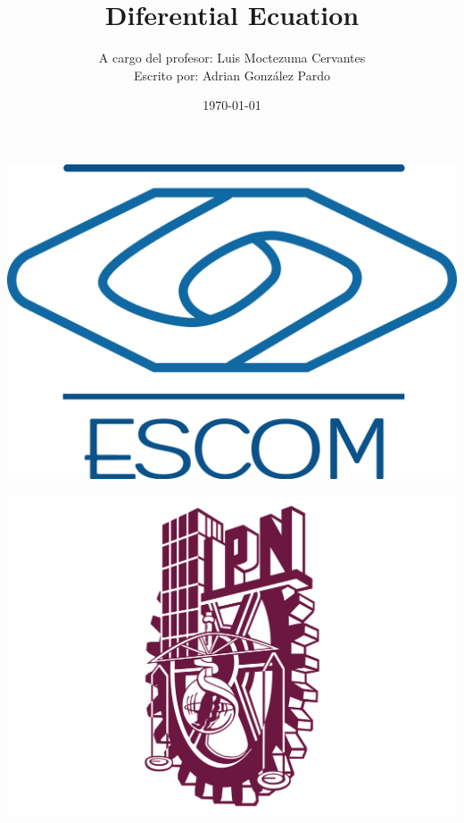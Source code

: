 \documentclass[10pt,executivepaper]{article}
\title{Diferential Ecuation}
\author{A cargo del profesor: Luis Moctezuma Cervantes\\Escrito por: Adrian González Pardo}
\date{\today}
\begin{document}
\begin{minipage}{0.4\textwidth}
	\begin{flushleft}
		\includegraphics[scale = 0.05]{logoescom.png}
	\end{flushleft}
\end{minipage}
\begin{minipage}{0.51\textwidth}
	\begin{flushright}
		\includegraphics[scale = 0.055]{logoipn.png}
	\end{flushright}
\end{minipage}
\end{document}
